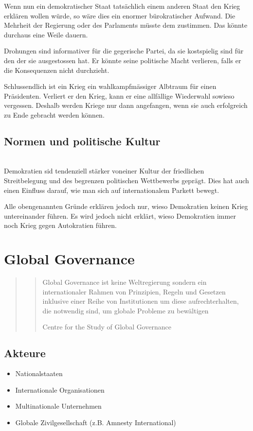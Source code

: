 \documentclass[a4paper, 11pt]{article}
\begin{document}
Wenn nun ein demokratischer Staat tatsächlich einem anderen Staat den Krieg erklären wollen würde, so wäre dies ein enormer bürokratischer Aufwand. Die Mehrheit der Regierung oder des Parlaments müsste dem zustimmen. Das könnte durchaus eine Weile dauern.

Drohungen sind informativer für die gegerische Partei, da sie kostspielig sind für den der sie ausgestossen hat. Er könnte seine politische Macht verlieren, falls er die Konsequenzen nicht durchzieht.

Schlussendlich ist ein Krieg ein wahlkampfmässiger Albtraum für einen Präsidenten. Verliert er den Krieg, kann er eine allfällige Wiederwahl sowieso vergessen. Deshalb werden Kriege nur dann angefangen, wenn sie auch erfolgreich zu Ende gebracht werden können.

\subsection{Normen und politische Kultur} \mbox{}\\
Demokratien sid tendenziell stärker voneiner Kultur der friedlichen Streitbelegung und des begrenzen politischen Wettbewerbs geprägt. Dies hat auch einen Einfluss darauf, wie man sich auf internationalem Parkett bewegt.

\vspace{20px}

\noindent Alle obengenannten Gründe erklären jedoch nur, wieso Demokratien keinen Krieg untereinander führen. Es wird jedoch nicht erklärt, wieso Demokratien immer noch Krieg gegen Autokratien führen.

\section{Global Governance}
\begin{quote}
    \centering
    \blockquote[Centre for the Study of Global Governance]{Global Governance ist keine Weltregierung sondern ein internationaler Rahmen von Prinzipien, Regeln und Gesetzen inklusive einer Reihe von Institutionen um diese aufrechterhalten, die notwendig sind, um globale Probleme zu bewältigen}
\end{quote}

\subsection{Akteure}
\begin{itemize}
    \item Nationalstaaten
    \item Internationale Organisationen
    \item Multinationale Unternehmen
    \item Globale Zivilgesellschaft (z.B. Amnesty International)
\end{itemize}
\end{document}
